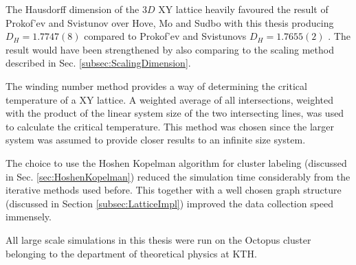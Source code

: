 The Hausdorff dimension of the $3D$ XY lattice heavily favoured the result of Prokof'ev and Svistunov over Hove, Mo and Sudbo with this thesis producing $D_H = 1.7747(8)$ compared to Prokof'ev and Svistunovs $D_H = 1.7655(2)$ \cite{Prokofev:comment_on_hove_hausdorff_crit_fluct}. The result would have been strengthened by also comparing to the scaling method described in Sec. \ref{subsec:ScalingDimension}.

The winding number method provides a way of determining the critical temperature of a XY lattice. A weighted average of all intersections, weighted with the product of the linear system size of the two intersecting lines, was used to calculate the critical temperature. This method was chosen since the larger system was assumed to provide closer results to an infinite size system.

The choice to use the Hoshen Kopelman algorithm for cluster labeling (discussed in Sec. \ref{sec:HoshenKopelman}) reduced the simulation time considerably from the iterative methods used before. This together with a well chosen graph structure (discussed in Section \ref{subsec:LatticeImpl}) improved the data collection speed immensely.

All large scale simulations in this thesis were run on the Octopus cluster belonging to the department of theoretical physics at KTH.



